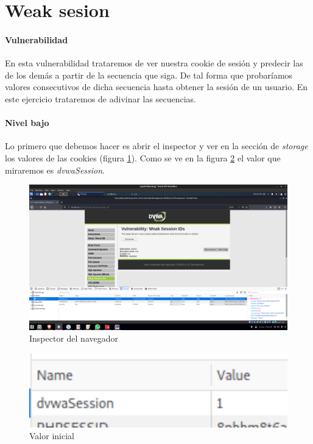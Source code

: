 \section{Weak sesion}
\paragraph{Vulnerabilidad} En esta vulnerabilidad trataremos de ver nuestra cookie 
de sesión y predecir las de los demás a partir de la secuencia que siga. De tal forma 
que probaríamos valores consecutivos de dicha secuencia hasta obtener la sesión de un usuario.
En este ejercicio trataremos de adivinar las secuencias.
\paragraph{Nivel bajo} Lo primero que debemos hacer es abrir el inspector y ver en 
la sección de {\it storage} los valores de las cookies (figura \ref{fig:weakinsp}). Como se ve en la figura 
\ref{fig:weakuno} el valor que miraremos es {\it dvwaSession}.
\begin{figure}[ht!]
    \centering
    \includegraphics[width=14cm]{img/weak/inspector.png}
    \caption{Inspector del navegador}
    \label{fig:weakinsp}
\end{figure}

\begin{figure}[ht!]
    \centering
    \includegraphics[width=14cm]{img/weak/one.png}
    \caption{Valor inicial }
    \label{fig:weakuno}
\end{figure}

